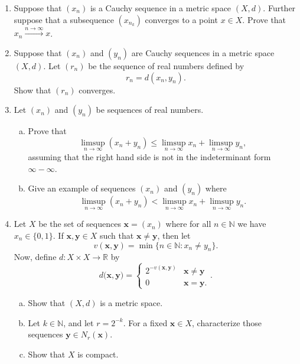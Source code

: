 \documentclass{amsart}
\newtheorem{theorem}{Theorem}
\begin{document}
\begin{enumerate}[1.]
\begin{theorem}
\begin{proof}
        Thus, we have found a sequence $(x_n)$ such that $(|x_n|)$ converges, but $(x_n)$ does not converge.
    \end{proof}
\end{theorem}

\newpage
\item Suppose that $(x_n)$ is a Cauchy sequence in a metric space $(X,d)$. Further suppose that a subsequence $(x_{n_k})$ converges to a point $x \in X$. Prove that $x_n \xrightarrow{n \to \infty} x$.
\newpage
\item Suppose that $(x_n)$ and $(y_n)$ are Cauchy sequences in a metric space $(X,d)$. Let $(r_n)$ be the sequence of real numbers defined by
\[ r_n = d(x_n, y_n). \]
Show that $(r_n)$ converges.
\newpage
\item Let $(x_n)$ and $(y_n)$ be sequences of real numbers.
\begin{enumerate}[(a)]
\item Prove that 
\[ \limsup_{n \to \infty} (x_n+y_n) \leq \limsup_{n \to \infty} x_n + \limsup_{n \to \infty} y_n, \]
assuming that the right hand side is not in the indeterminant form $\infty-\infty$.
\item Give an example of sequences $(x_n)$ and $(y_n)$ where
\[ \limsup_{n \to \infty} (x_n+y_n) < \limsup_{n \to \infty} x_n + \limsup_{n \to \infty} y_n.\]
\end{enumerate}
\newpage
\item  Let $X$ be the set of sequences $\mathbf{x} = (x_n)$ where for all $n \in \mathbb{N}$ we have $x_n \in \{0,1\}$. If $\mathbf{x},\mathbf{y} \in X$ such that $\mathbf{x} \neq \mathbf{y}$, then let
\[ v(\mathbf{x},\mathbf{y}) = \min\{ n \in \mathbb{N}: x_n \neq y_n \}.\]
Now, define $d: X \times X \to \mathbb{R}$ by
\[ d\big( \mathbf{x},\mathbf{y} \big) = \begin{cases} 2^{-v( \mathbf{x},\mathbf{y} )} & \mathbf{x} \neq \mathbf{y} \\ 0 & \mathbf{x}=\mathbf{y}.\end{cases}.\]
\begin{enumerate}[(a)]
\item Show that $(X,d)$ is a metric space.
\item Let $k \in \mathbb{N}$, and let $r=2^{-k}$. For a fixed $\mathbf{x} \in X$, characterize those sequences $\mathbf{y} \in N_{r}(\mathbf{x})$.
\item Show that $X$ is compact.
\end{enumerate}
\end{enumerate}
\end{document}
